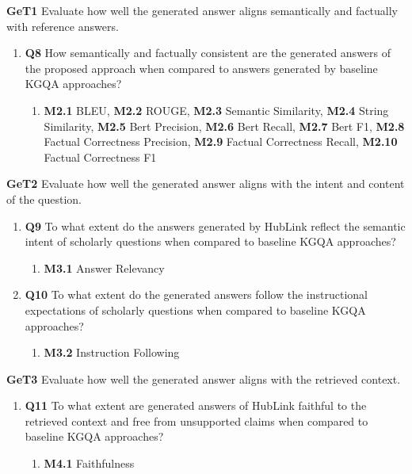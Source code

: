 % 
\textbf{GeT1} Evaluate how well the generated answer aligns semantically and factually with reference answers.
\begin{enumerate}[label={}]
    \item \textbf{Q8} How semantically and factually consistent are the generated answers of the proposed approach when compared to answers generated by baseline KGQA approaches?
    \begin{enumerate}[label={}]
        \item \textbf{M2.1} BLEU, \textbf{M2.2} ROUGE, \textbf{M2.3} Semantic Similarity, \textbf{M2.4} String Similarity, \textbf{M2.5} Bert Precision, \textbf{M2.6} Bert Recall, \textbf{M2.7} Bert F1, \textbf{M2.8} Factual Correctness Precision, \textbf{M2.9} Factual Correctness Recall, \textbf{M2.10} Factual Correctness F1 \\
    \end{enumerate}
\end{enumerate}
%
\textbf{GeT2} Evaluate how well the generated answer aligns with the intent and content of the question.
\begin{enumerate}[label={}]
    \item \textbf{Q9} To what extent do the answers generated by HubLink reflect the semantic intent of scholarly questions when compared to baseline KGQA approaches?
    \begin{enumerate}[label={}]
        \item \textbf{M3.1} Answer Relevancy
    \end{enumerate}
    \item \textbf{Q10} To what extent do the generated answers follow the instructional expectations of scholarly questions when compared to baseline KGQA approaches?
    \begin{enumerate}[label={}]
        \item \textbf{M3.2} Instruction Following
    \end{enumerate}
\end{enumerate}
% 
\textbf{GeT3} Evaluate how well the generated answer aligns with the retrieved context.
\begin{enumerate}[label={}]
    \item \textbf{Q11} To what extent are generated answers of HubLink faithful to the retrieved context and free from unsupported claims when compared to baseline KGQA approaches?
    \begin{enumerate}[label={}]
        \item \textbf{M4.1} Faithfulness
    \end{enumerate}
\end{enumerate}



